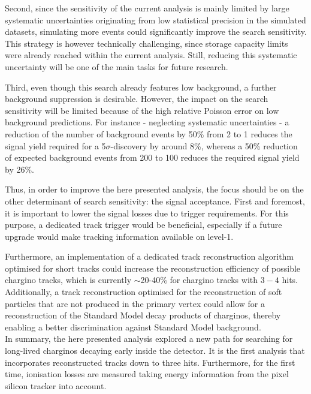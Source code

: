 Second, since the sensitivity of the current analysis is mainly limited by large systematic uncertainties originating from low statistical precision in the simulated datasets, simulating more events could significantly improve the search sensitivity.
This strategy is however technically challenging, since storage capacity limits were already reached within the current analysis.
Still, reducing this systematic uncertainty will be one of the main tasks for future research.

Third, even though this search already features low background, a further background suppression is desirable.
However, the impact on the search sensitivity will be limited because of the high relative Poisson error on low background predictions.
For instance - neglecting systematic uncertainties - a reduction of the number of background events by 50\% from 2 to 1 reduces the signal yield required for a 5$\sigma$-discovery by around 8\%, whereas a 50\% reduction of expected background events from 200 to 100 reduces the required signal yield by 26\%.

Thus, in order to improve the here presented analysis, the focus should be on the other determinant of search sensitivity: the signal acceptance.
First and foremost, it is important to lower the signal losses due to trigger requirements.
For this purpose, a dedicated track trigger would be beneficial, especially if a future upgrade would make tracking information available on level-1.

Furthermore, an implementation of a dedicated track reconstruction algorithm optimised for short tracks could increase the reconstruction efficiency of possible chargino tracks, which is currently $\sim$20-40\% for chargino tracks with $3-4$ hits.
Additionally, a track reconstruction optimised for the reconstruction of soft particles that are not produced in the primary vertex could allow for a reconstruction of the Standard Model decay products of charginos, thereby enabling a better discrimination against Standard Model background.\\


In summary, the here presented analysis explored a new path for searching for long-lived charginos decaying early inside the detector.
It is the first analysis that incorporates reconstructed tracks down to three hits.
Furthermore, for the first time, ionisation losses are measured taking energy information from the pixel silicon tracker into account.

